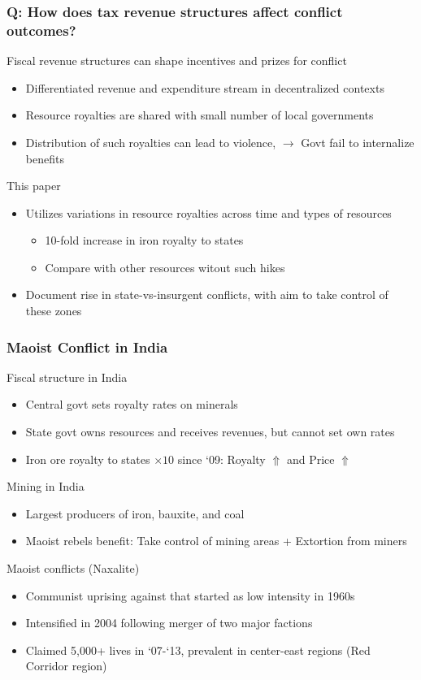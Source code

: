 \documentclass[aspectratio=169]{beamer}
\begin{document}
\begin{frame}
\frametitle{Q: How does tax revenue structures affect conflict outcomes?} 
Fiscal revenue structures can shape incentives and prizes for conflict
\begin{itemize}\setlength\itemsep{3pt}
\item Differentiated revenue and expenditure stream in decentralized contexts
\item Resource royalties are shared with small number of local governments
\item Distribution of such royalties can lead to violence, $\to$ Govt fail to internalize benefits
\end{itemize} \medskip
This paper
\begin{itemize}\setlength\itemsep{3pt}
\item Utilizes variations in resource royalties across time and types of resources
\begin{itemize}\setlength\itemsep{3pt}
\item 10-fold increase in iron royalty to states 
\item Compare with other resources witout such hikes
\end{itemize}
\item Document rise in state-vs-insurgent conflicts, with aim to take control of these zones
\end{itemize}
\end{frame}

\begin{frame}
\frametitle{Maoist Conflict in India} 
Fiscal structure in India
\begin{itemize}\setlength\itemsep{3pt}
\item Central govt sets royalty rates on minerals
\item State govt owns resources and receives revenues, but cannot set own rates
\item Iron ore royalty to states $\times10$ since `09: Royalty $\Uparrow$ and Price $\Uparrow$ 
\end{itemize}\medskip
Mining in India
\begin{itemize}\setlength\itemsep{3pt}
\item Largest producers of iron, bauxite, and coal
\item Maoist rebels benefit: Take control of mining areas + Extortion from miners
\end{itemize}\medskip
Maoist conflicts (Naxalite)
\begin{itemize}\setlength\itemsep{3pt}
\item Communist uprising against that started as low intensity in 1960s
\item Intensified in 2004 following merger of two major factions
\item Claimed 5,000+ lives in `07-`13, prevalent in center-east regions (Red Corridor region)
\end{itemize}
\end{frame}
\end{document}
